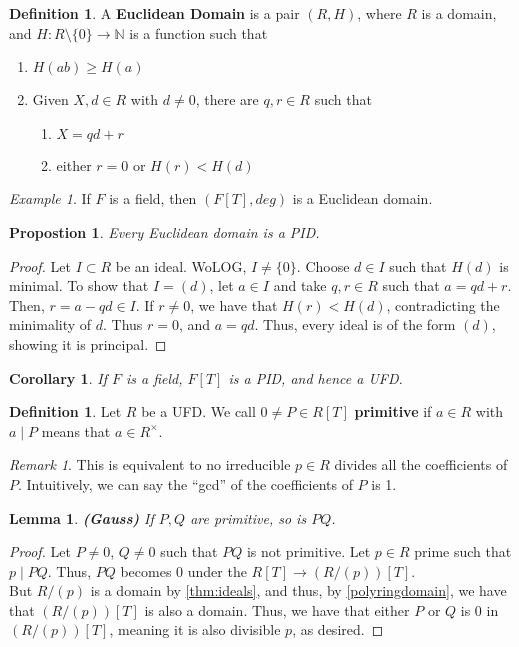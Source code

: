 \documentclass{amsart}
\newcommand{\NN}{\mathbb{N}}
\newtheorem{lemma}[thm]{Lemma}
\newtheorem{prop}[thm]{Propostion}
\newtheorem{cor}{Corollary}
\theoremstyle{definition}
\newtheorem{defn}[thm]{Definition}
\theoremstyle{remark}
\newtheorem*{rmk}{Remark}
\newtheorem*{ex}{Example}
\begin{document}
\begin{defn}
    A \textbf{Euclidean Domain} is a pair $(R, H)$, where $R$ is a domain, and
    $H: R \setminus \{0\} \rightarrow \NN$ is a function such that
    \begin{enumerate}
        \item $H(ab) \geq H(a)$
        \item Given $X,d \in R$ with $d \neq 0$, there are $q, r \in R$ such that
        \begin{enumerate}
            \item $X = qd + r$
            \item either $r = 0$ or $H(r) < H(d)$
        \end{enumerate}
    \end{enumerate}
\end{defn}
\begin{ex}
    If $F$ is a field, then $(F[T], deg)$ is a Euclidean domain.
\end{ex}
\begin{prop}
    Every Euclidean domain is a PID.
\end{prop}
\begin{proof}
    Let $I \subset R$ be an ideal. WoLOG, $I \neq \{0\}$. Choose $d \in I$ such
    that $H(d)$ is minimal. To show that $I = (d)$, let $a \in I$ and take $q,r \in R$
    such that $a = qd + r$. Then, $r = a - qd \in I$. If $r \neq 0$, we have that $H(r) < H(d)$,
    contradicting the minimality of $d$. Thus $r = 0$, and $a = qd$. Thus,
    every ideal is of the form $(d)$, showing it is principal.
\end{proof}
\begin{cor}
    If $F$ is a field, $F[T]$ is a PID, and hence a UFD.
\end{cor}
\begin{defn}
    Let $R$ be a UFD. We call $0 \neq P \in R[T]$ \textbf{primitive} if $a \in R$
    with $a \mid P$ means that $a \in R^\times$.
\end{defn}
\begin{rmk}
    This is equivalent to no irreducible $p \in R$ divides all the coefficients of
    $P$. Intuitively, we can say the ``gcd'' of the coefficients of $P$ is 1.
\end{rmk}
\begin{lemma}
    \textbf{(Gauss)} If $P,Q$ are primitive, so is $PQ$.
\end{lemma}
\begin{proof}
    Let $P \neq 0$, $Q \neq 0$ such that $PQ$ is not primitive. Let $p \in R$ prime
    such that $p \mid PQ$. Thus, $PQ$ becomes $0$ under the
    $R[T] \rightarrow (R/(p))[T]$. \\
    But $R / (p)$ is a domain by \ref{thm:ideals}, and thus, by \ref{polyringdomain}, we have
    that $(R/(p))[T]$ is also a domain. Thus, we have that either $P$ or $Q$ is
    0 in $(R / (p))[T]$, meaning it is also divisible $p$, as desired.
\end{proof}
\end{document}
